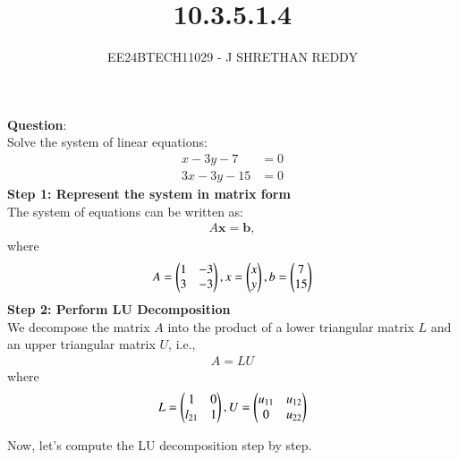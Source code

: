 \documentclass[journal]{IEEEtran}
\begin{document}

\vspace{3cm}

\title{10.3.5.1.4}
\author{EE24BTECH11029 - J SHRETHAN REDDY}
\maketitle
{\let\newpage\relax\maketitle}

\renewcommand{\thefigure}{\theenumi}
\renewcommand{\thetable}{\theenumi}
\setlength{\intextsep}{10pt} %


\renewcommand{\thetable}{\theenumi}
\textbf{Question}:\\
Solve the system of linear equations:
\begin{align}
    x - 3y - 7 &= 0 \\
    3x - 3y - 15 &= 0
\end{align}
\textbf{Step 1: Represent the system in matrix form} \\ 
The system of equations can be written as:  
\begin{align}  
A \mathbf{x} = \mathbf{b},  
\end{align}  
where  
\begin{align}
    A=\begin{pmatrix}1 & -3 \\ 
             3 & -3\end{pmatrix} ,
    x=\begin{pmatrix}x\\y\end{pmatrix} ,
    b=\begin{pmatrix}7 \\ 15\end{pmatrix}
\end{align}
\textbf{Step 2: Perform LU Decomposition} \\ 
We decompose the matrix $A$ into the product of a lower triangular matrix $L$ and an upper triangular matrix $U$, i.e.,  
\begin{align}  
A = LU
\end{align}  
where  
\begin{align}  
L=\begin{pmatrix}1 & 0\\l_{21} & 1\end{pmatrix},
U=\begin{pmatrix}u_{11} & u_{12}\\0 & u_{22}\end{pmatrix}
\end{align}

Now, let's compute the LU decomposition step by step.  
\end{document}
